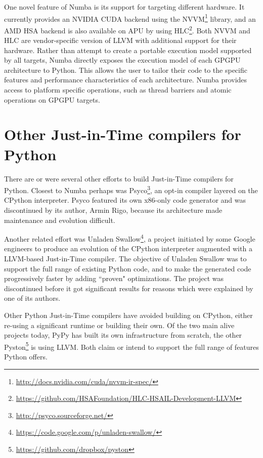 \documentclass{acm_proc_article-sp}
\begin{document}
One novel feature of Numba is its support for targeting different
hardware.  It currently provides an NVIDIA CUDA\cite{CUDA} backend using the
NVVM\footnote{\url{http://docs.nvidia.com/cuda/nvvm-ir-spec/}}
library, and an AMD HSA\cite{HSA} backend is also available on APU by using
HLC\footnote{\url{https://github.com/HSAFoundation/HLC-HSAIL-Development-LLVM}}.
Both NVVM and HLC are vendor-specific version of LLVM with additional
support for their hardware.  Rather than attempt to create a portable
execution model supported by all targets, Numba directly exposes the
execution model of each GPGPU architecture to Python.  This allows the
user to tailor their code to the specific features and performance
characteristics of each architecture.  Numba provides access to
platform specific operations, such as thread barriers and atomic
operations on GPGPU targets.

\section{Other Just-in-Time compilers for Python}

There are or were several other efforts to build Just-in-Time compilers
for Python.  Closest to Numba perhaps was
Psyco\footnote{\url{http://psyco.sourceforge.net/}}, an opt-in compiler layered
on the CPython interpreter.  Psyco featured its own x86-only code generator
and was discontinued by its author, Armin Rigo, because its architecture
made maintenance and evolution difficult. \cite{rigo2004representation}

Another related effort was
Unladen Swallow\footnote{\url{https://code.google.com/p/unladen-swallow/}},
a project initiated by some
Google engineers to produce an evolution of the CPython interpreter augmented
with a LLVM-based Just-in-Time compiler.
The objective of Unladen Swallow was to support the full range of existing
Python code, and to make the generated code progressively faster by adding
``proven" optimizations.  The project was discontinued before it got
significant results for reasons which were explained by one of its authors.
\cite{kleckner:unladen_swallow_post_mortem}

Other Python Just-in-Time compilers have avoided building on CPython,
either re-using a significant runtime or building their own.  Of the
two main alive projects today, PyPy \cite{pypy:pypy} has built its
own infrastructure from scratch, the other
Pyston\footnote{\url{https://github.com/dropbox/pyston}}
is using LLVM.  Both claim or intend to support the full range of features
Python offers.
\end{document}
